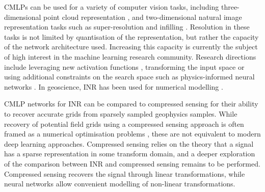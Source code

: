 CMLPs can be used for a variety of computer vision tasks, including three-dimensional point cloud representation \parencite{qiPointNetDeepHierarchical2017}, and two-dimensional natural image representation tasks such as super-resolution and infilling \parencite{leeLocalTextureEstimator2022, chenLearningContinuousImage2021}.
Resolution in these tasks is not limited by quantisation of the representation, but rather the capacity of the network architecture used.
Increasing this capacity is currently the subject of high interest in the machine learning research community.
Research directions include leveraging new activation functions \parencite{saragadamWIREWaveletImplicit2023}, transforming the input space \parencite[e.g.][]{benbarkaSeeingImplicitNeural2022} or using additional constraints on the search space such as physics-informed neural networks \parencite{raissiPhysicsinformedNeuralNetworks2019}.
In geoscience, INR has been used for numerical modelling \parencite{hillierGeoINRImplicitNeural2023}.

CMLP networks for INR can be compared to compressed sensing \parencite{candesIntroductionCompressiveSampling2008} for their ability to recover accurate grids from sparsely sampled geophysics samples.
While recovery of potential field grids using a compressed sensing approach is often framed as a numerical optimisation problems \parencite[e.g.][]{yangAirborneGravimetryData2015,xuGravityAnomalyReconstruction2019}, these are not equivalent to modern deep learning approaches.
Compressed sensing relies on the theory that a signal has a sparse representation in some transform domain, and a deeper exploration of the comparison between INR and compressed sensing remains to be performed.
Compressed sensing recovers the signal through linear transformations, while neural networks allow convenient modelling of non-linear transformations.

